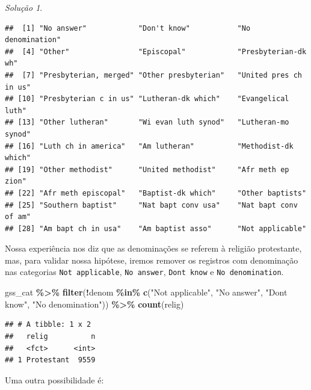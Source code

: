 \documentclass[
]{latex/krantz}
\newenvironment{Shaded}{\begin{snugshade}}{\end{snugshade}}
\newcommand{\FunctionTok}[1]{\textcolor[rgb]{0.13,0.29,0.53}{\textbf{#1}}}
\newcommand{\NormalTok}[1]{#1}
\newcommand{\SpecialCharTok}[1]{\textcolor[rgb]{0.81,0.36,0.00}{\textbf{#1}}}
\newcommand{\StringTok}[1]{\textcolor[rgb]{0.31,0.60,0.02}{#1}}
\theoremstyle{definition}
\theoremstyle{definition}
\theoremstyle{definition}
\theoremstyle{definition}
\theoremstyle{remark}
\newtheorem*{solution}{Solução}
\begin{document}
\begin{solution}
\begin{Shaded}
\end{Shaded}

\begin{verbatim}
##  [1] "No answer"            "Don't know"           "No denomination"     
##  [4] "Other"                "Episcopal"            "Presbyterian-dk wh"  
##  [7] "Presbyterian, merged" "Other presbyterian"   "United pres ch in us"
## [10] "Presbyterian c in us" "Lutheran-dk which"    "Evangelical luth"    
## [13] "Other lutheran"       "Wi evan luth synod"   "Lutheran-mo synod"   
## [16] "Luth ch in america"   "Am lutheran"          "Methodist-dk which"  
## [19] "Other methodist"      "United methodist"     "Afr meth ep zion"    
## [22] "Afr meth episcopal"   "Baptist-dk which"     "Other baptists"      
## [25] "Southern baptist"     "Nat bapt conv usa"    "Nat bapt conv of am" 
## [28] "Am bapt ch in usa"    "Am baptist asso"      "Not applicable"
\end{verbatim}

Nossa experiência nos diz que as denominações se referem à religião protestante, mas, para validar nossa hipótese, iremos remover os registros com denominação nas categorias \texttt{Not\ applicable}, \texttt{No\ answer}, \texttt{Don\textquotesingle{}t\ know} e \texttt{No\ denomination}.

\begin{Shaded}
\begin{Highlighting}[]
\NormalTok{gss\_cat }\SpecialCharTok{\%\textgreater{}\%}
  \FunctionTok{filter}\NormalTok{(}\SpecialCharTok{!}\NormalTok{denom }\SpecialCharTok{\%in\%} \FunctionTok{c}\NormalTok{(}\StringTok{"Not applicable"}\NormalTok{, }\StringTok{"No answer"}\NormalTok{, }\StringTok{"Don\textquotesingle{}t know"}\NormalTok{, }\StringTok{"No denomination"}\NormalTok{)) }\SpecialCharTok{\%\textgreater{}\%}
  \FunctionTok{count}\NormalTok{(relig)}
\end{Highlighting}
\end{Shaded}

\begin{verbatim}
## # A tibble: 1 x 2
##   relig          n
##   <fct>      <int>
## 1 Protestant  9559
\end{verbatim}

Uma outra possibilidade é:


\end{solution}
\end{document}
